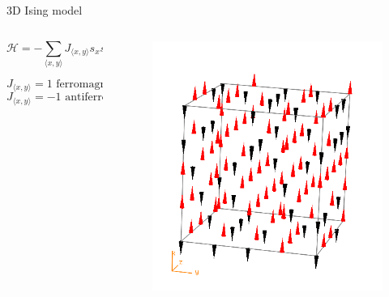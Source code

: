 \documentclass[12pt,handout]{beamer}
\begin{document}
\begin{frame}{3D Ising model}
\begin{center}
\begin{columns}
\begin{column}{0.43\textwidth}
 \[
\mathcal{H} = -\sum_{\langle x, y \rangle} J_{\langle x, y \rangle} s_x s_y
\]

\[
J_{\langle x, y \rangle} = 1\text{ ferromagnetic}
\]
\[
J_{\langle x, y \rangle} = -1\text{ antiferromagnetic}
\]
\end{column}

\begin{column}{0.57\textwidth}  %
 \begin{figure}[!htb]
\centering
\includegraphics[scale=0.5]{ising3D.png}
\end{figure}
\end{column}
\end{columns}


\end{center}
\end{frame}
\end{document}
